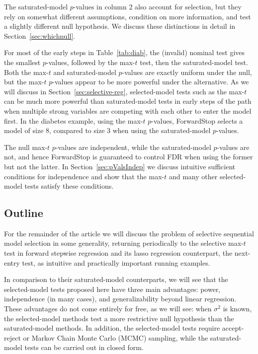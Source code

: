 \documentclass{article}
\begin{document}
The saturated-model $p$-values in column 2 also account for selection, but they rely on somewhat different assumptions, condition on more information, and test a slightly different null hypothesis. We discuss these distinctions in detail in Section~\ref{sec:whichnull}.

For most of the early steps in Table~\ref{tab:diab}, the (invalid) nominal test gives the smallest $p$-values, followed by the max-$t$ test, then the saturated-model test. Both the max-$t$ and saturated-model $p$-values are exactly uniform under the null, but the max-$t$ $p$-values appear to be more powerful under the alternative. As we will discuss in Section~\ref{sec:selective-reg}, selected-model tests such as the max-$t$ can be much more powerful than saturated-model tests in early steps of the path when multiple strong variables are competing with each other to enter the model first. In the diabetes example, using the max-$t$ $p$-values, ForwardStop selects a model of size 8, compared to size 3 when using the saturated-model $p$-values. 

The null max-$t$ $p$-values are independent, while the saturated-model $p$-values are not, and hence ForwardStop is guaranteed to control FDR when using the former but not the latter. In Section~\ref{sec:pValsIndep} we discuss intuitive sufficient conditions for independence and show that the max-$t$ and many other selected-model tests satisfy these conditions.


\subsection{Outline}

For the remainder of the article we will discuss the problem of selective sequential model selection in some generality, returning periodically to the selective max-$t$ test in forward stepwise regression and its lasso regression counterpart, the next-entry test, as intuitive and practically important running examples. 

In comparison to their saturated-model counterparts, we will see that the selected-model tests proposed here have three main advantages: power, independence (in many cases), and generalizability beyond linear regression. These advantages do not come entirely for free, as we will see: when $\sigma^2$ is known, the selected-model methods test a more restrictive null hypothesis than the saturated-model methods. In addition, the selected-model tests require accept-reject or Markov Chain Monte Carlo (MCMC) sampling, while the saturated-model tests can be carried out in closed form.
\end{document}
